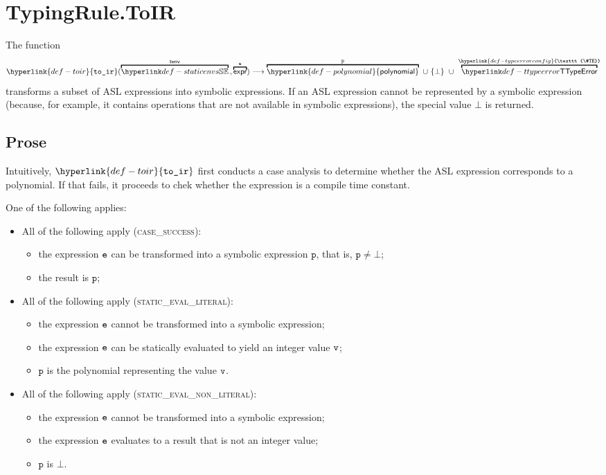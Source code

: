 \documentclass{book}
\newcommand\TypeErrorConfig[0]{\hyperlink{def-typeerrorconfig}{\texttt{\#TE}}}
\newcommand\toir[0]{\hyperlink{def-toir}{\texttt{to\_ir}}}
\newcommand\polynomial[0]{\hyperlink{def-polynomial}{\textsf{polynomial}}}
\newcommand\vp[0]{\texttt{p}}
\begin{document}
\section{TypingRule.ToIR \label{sec:TypingRule.ToIR}}
\hypertarget{def-toir}{}
The function
\[
  \toir(\overname{\staticenvs}{\tenv} \aslsep \overname{\expr}{\ve}) \aslto
  \overname{\polynomial}{\vp}\ \cup\ \{\bot\}\ \cup\ \overname{\TTypeError}{\TypeErrorConfig}
\]
transforms a subset of ASL expressions into symbolic expressions. If an ASL expression cannot be represented
by a symbolic expression (because, for example, it contains operations that are not available in symbolic expressions),
the special value $\bot$ is returned.

\subsection{Prose}
Intuitively, $\toir$ first conducts a case analysis to determine whether the ASL expression corresponds to a polynomial.
If that fails, it proceeds to chek whether the expression is a compile time constant.

One of the following applies:
\begin{itemize}
  \item All of the following apply (\textsc{case\_success}):
  \begin{itemize}
    \item the expression $\texttt{e}$ can be transformed into a symbolic expression $\vp$,
          that is, $\vp \neq \bot$;
    \item the result is $\vp$;
  \end{itemize}

  \item All of the following apply (\textsc{static\_eval\_literal}):
  \begin{itemize}
    \item the expression $\texttt{e}$ cannot be transformed into a symbolic expression;
    \item the expression $\texttt{e}$ can be statically evaluated to yield an integer value $\texttt{v}$;
    \item $\vp$ is the polynomial representing the value $\texttt{v}$.
  \end{itemize}

  \item All of the following apply (\textsc{static\_eval\_non\_literal}):
  \begin{itemize}
    \item the expression $\texttt{e}$ cannot be transformed into a symbolic expression;
    \item the expression $\texttt{e}$ evaluates to a result that is not an integer value;
    \item $\vp$ is $\bot$.
  \end{itemize}
\end{itemize}
\end{document}
